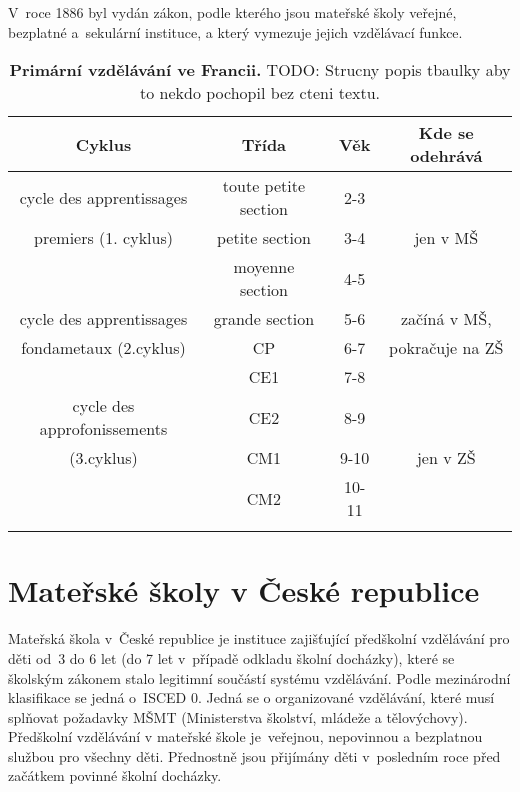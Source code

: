 		V roce 1886 byl vydán zákon, podle kterého jsou mateřské školy veřejné, bezplatné a sekulární instituce, a který vymezuje jejich vzdělávací funkce.

\begin{spacing}{1.0}
\begin{table}[h]
	\small
	\begin{center}
	\begin{tabular}{|c|c|c|c|}
		\hline
		\rowcolor{grey}
		\textbf{Cyklus}				& \textbf{Třída}		& \textbf{Věk}	& \textbf{Kde se odehrává}	\\
		\hline
		\hline
		\rowcolor{grey!10}
		cycle des apprentissages	& toute petite section 	& 2-3 		&				\\ \rowcolor{grey!10}
		premiers (1. cyklus)		& petite section 		& 3-4 		& jen v MŠ 		\\ \rowcolor{grey!10}
									& moyenne section 		& 4-5 		& 				\\ \rowcolor{grey!10}
		\hline
		cycle des apprentissages 	& grande section 		& 5-6 		& začíná v MŠ, 		\\ \rowcolor{grey!10}
		fondametaux (2.cyklus) 		& CP 					& 6-7 		& pokračuje na ZŠ 	\\ \rowcolor{grey!10}
									& CE1 					& 7-8 		& 					\\ \rowcolor{grey!10}
		\hline
		cycle des approfonissements & CE2 					& 8-9 		&					\\ \rowcolor{grey!10}
		(3.cyklus)					& CM1 					& 9-10 		& jen v ZŠ 			\\ \rowcolor{grey!10}
									& CM2 					& 10-11 	& 					\\ \rowcolor{grey!10}
		\hline
	\end{tabular}
	\end{center}
	\caption{ \textbf{Primární vzdělávání ve Francii.}
		TODO: Strucny popis tbaulky aby to nekdo pochopil bez cteni textu.
	}
	\label{tab:primarniVzdelavaniFR}
\end{table}
\end{spacing}

	\section{Mateřské školy v České republice}
		Mateřská škola v České republice je instituce zajišťující předškolní vzdělávání pro děti od 3 do 6 let (do 7 let v případě odkladu školní docházky), které se školským zákonem stalo legitimní součástí systému vzdělávání. Podle mezinárodní klasifikace se jedná o ISCED 0. Jedná se o organizované vzdělávání, které musí splňovat požadavky MŠMT (Ministerstva školství, mládeže a tělovýchovy). Předškolní vzdělávání v mateřské škole je veřejnou, nepovinnou a bezplatnou službou pro všechny děti. Přednostně jsou přijímány děti v posledním roce před začátkem povinné školní docházky. 

